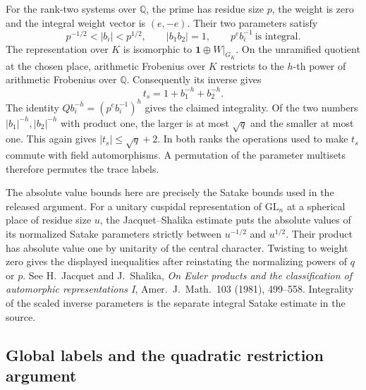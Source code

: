 For the rank-two systems over \(\mathbb Q\), the prime has residue
size \(p\), the weight is zero and the integral weight vector is
\((e,-e)\). Their two parameters satisfy
\[
   p^{-1/2}<|b_i|<p^{1/2},\qquad |b_1b_2|=1,\qquad
             p^e b_i^{-1}\ \text{is integral}.
\]
The representation over \(K\) is isomorphic to
\(\mathbf1\oplus W|_{G_K}\). On the unramified quotient at the
chosen place, arithmetic Frobenius over \(K\) restricts to the
\(h\)-th power of arithmetic Frobenius over \(\mathbb Q\).
Consequently its inverse gives
\[
                   t_s=1+b_1^{-h}+b_2^{-h}.
\]
The identity \(Qb_i^{-h}=(p^eb_i^{-1})^h\) gives the claimed
integrality. Of the two numbers \(|b_1|^{-h}, |b_2|^{-h}\) with
product one, the larger is at most \(\sqrt q\) and the smaller
at most one. This again gives \(|t_s|\le\sqrt q+2\).
In both ranks the operations used to make \(t_s\) commute with
field automorphisms. A permutation of the parameter multisets
therefore permutes the trace labels.

The absolute value bounds here are precisely the Satake bounds
used in the released argument. For a unitary cuspidal
representation of \(\mathrm{GL}_n\) at a spherical place of residue
size \(u\), the Jacquet--Shalika estimate puts the absolute values
of its normalized Satake parameters strictly between \(u^{-1/2}\)
and \(u^{1/2}\). Their product has absolute value one by unitarity
of the central character. Twisting to weight zero gives the
displayed inequalities after reinstating the normalizing powers of
\(q\) or \(p\). See H.~Jacquet and J.~Shalika, \emph{On Euler
products and the classification of automorphic representations I},
Amer.~J.~Math.~103 (1981), 499--558. Integrality of the scaled
inverse parameters is the separate integral Satake estimate in the
source.

\subsection{Global labels and the quadratic restriction argument}

